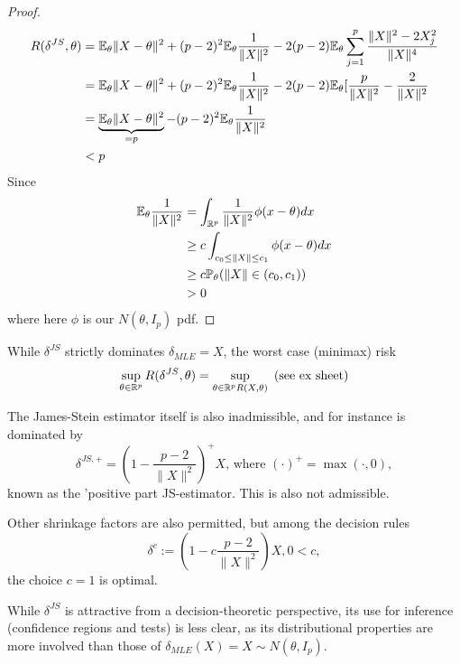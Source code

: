 \documentclass[a4paper]{article}
\begin{document}
\begin{proof}
\begin{align*}
	R(\delta^{JS}, \theta) &= \mathbb{E}_{\theta}\|X-\theta\|^2 + (p-2)^2\mathbb{E}_{\theta}\frac{1}{\|X\|^2} - 2(p-2) \mathbb{E}_{\theta} \sum_{j=1}^{p} \frac{ \|X\|^2 -2X_{j}^2}{\|X\|^{4}} \\
	&= \mathbb{E}_{\theta}\|X-\theta\|^2 + (p-2)^2\mathbb{E}_{\theta}\frac{1}{\|X\|^2} - 2(p-2) \mathbb{E}_{\theta} [\frac{p}{\|X\|^2} -\frac{2}{\|X\|^2} \\
	&= \underbrace{\mathbb{E}_{\theta}\|X-\theta\|^2}_{=p} - (p-2)^2\mathbb{E}_{\theta}\frac{1}{\|X\|^2} \\
	&<p
\end{align*}
Since
\begin{align*}
	\mathbb{E}_{\theta} \frac{1}{\|X\|^2} &= \int_{\mathbb{R}^{p}} \frac{1}{\|X\|^2} \phi(x-\theta) dx \\
	&\ge c \int_{c_0 \le \|X\| \le c_1} \phi(x-\theta)dx \\
	&\ge c \mathbb{P}_{\theta} (\|X\|\in (c_0, c_1)) \\
	&> 0
\end{align*}
where here $\phi$ is our $N(\theta, I_p )$ pdf.
\end{proof}

\begin{remark}
	\enumerate[label=\roman*)]
\item
	While $\delta^{JS}$ strictly dominates $\delta_{MLE} = X$, the worst case (minimax) risk
	\[
		\sup_{\theta \in \mathbb{R}^{p}} R(\delta^{JS}, \theta) = \sup_{\theta \in \mathbb{R}^{p} R(X, \theta)} \text{ (see ex sheet)}
	\] 

\item
	The James-Stein estimator itself is also inadmissible, and for instance is dominated by
	\[
		\delta^{JS, +} =  \left(1-\frac{p-2}{\|X\|^2}\right)^{+}X\text{, where } (\cdot )^{+} = \max(\cdot , 0)
	,\] known as the 'positive part JS-estimator. This is also not admissible.

\item
	Other shrinkage factors are also permitted, but among the decision rules
	\[
	\delta^{c} := \left(1-c \frac{p-2}{\|X\|^2}\right) X, 0<c
	,\] the choice $c=1$ is optimal.

\item While $\delta^{JS}$ is attractive from a decision-theoretic perspective, its use for inference (confidence regions and tests) is less clear, as its distributional properties are more involved than those of $\delta_{MLE}(X) = X \sim N(\theta, I_p)$.
\end{remark}

\newpage
\end{document}

